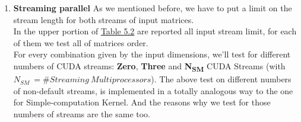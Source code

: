 \begin{enumerate}
	\item \textbf{Streaming parallel}
	As we mentioned before, we have to put a limit on the stream length for both streams of input matrices.\\
	In the upper portion of \hyperref[tab:matdata]{Table 5.2} are reported all input stream limit, for each of them we test all of matrices order.\\
	For every combination given by the input dimensions, we'll test for different numbers of CUDA streams: \textbf{Zero}, \textbf{Three} and \textbf{N\textsubscript{SM}} CUDA Streams (with \(N_{SM} \ =\# Streaming \ Multiprocessors\)).
	The above test on different numbers of non-default streams, is implemented in a totally analogous way to the one for Simple-computation Kernel. And the reasons why we test for those numbers of streams are the same too.
\end{enumerate}



